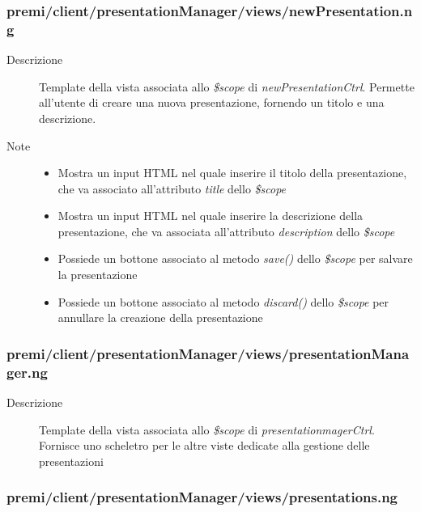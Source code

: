 \subsubsection{premi/client/presentationManager/views/newPresentation.ng}

\begin{description}
\item[Descrizione] \hfill
	Template della vista associata allo \textit{\$scope} di \textit{newPresentationCtrl}. Permette all'utente di creare una nuova presentazione, fornendo un titolo e una descrizione.
\item[Note] \hfill
	\begin{itemize}
			\item Mostra un input HTML nel quale inserire il titolo della presentazione, che va associato all'attributo \textit{title} dello \textit{\$scope}
			\item Mostra un input HTML nel quale inserire la descrizione della presentazione, che va associata all'attributo \textit{description} dello \textit{\$scope}
			\item Possiede un bottone associato al metodo \textit{save()} dello \textit{\$scope} per salvare la presentazione
			\item Possiede un bottone associato al metodo \textit{discard()} dello \textit{\$scope} per annullare la creazione della presentazione
	\end{itemize}
\end{description}

\subsubsection{premi/client/presentationManager/views/presentationManager.ng}

\begin{description}
\item[Descrizione] \hfill
	Template della vista associata allo \textit{\$scope} di \textit{presentationmagerCtrl}. Fornisce uno scheletro per le altre viste dedicate alla gestione delle presentazioni
\end{description}



\subsubsection{premi/client/presentationManager/views/presentations.ng}

